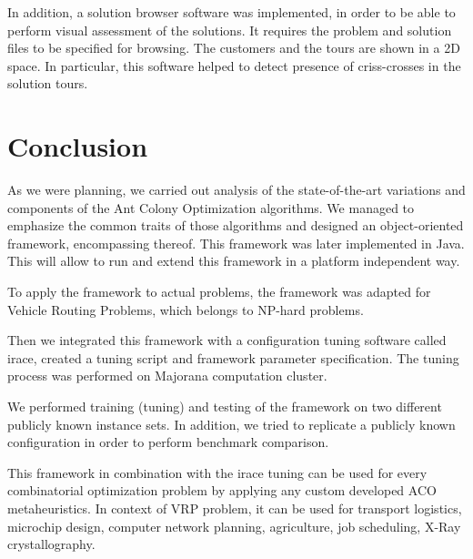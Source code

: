 \documentclass[11pt,a4paper,oneside]{book}
\begin{document}
In addition, a solution browser software was implemented, in order to be able to perform visual assessment of the solutions. It requires the problem and solution files to be specified for browsing. The customers and the tours are shown in a 2D space. In particular, this software helped to detect presence of criss-crosses in the solution tours.




\chapter{Conclusion}

As we were planning, we carried out analysis of the state-of-the-art variations and components of the Ant Colony Optimization algorithms. We managed to emphasize the common traits of those algorithms and designed an object-oriented framework, encompassing thereof. This framework was later implemented in Java. This will allow to run and extend this framework in a platform independent way.

To apply the framework to actual problems, the framework was adapted for Vehicle Routing Problems, which belongs to NP-hard problems.

Then we integrated this framework with a configuration tuning software called irace, created a tuning script and framework parameter specification. The tuning process was performed on Majorana computation cluster.

We performed training (tuning) and testing of the framework on two different publicly known instance sets. In addition, we tried to replicate a publicly known configuration in order to perform benchmark comparison.

This framework in combination with the irace tuning can be used for every combinatorial optimization problem by applying any custom developed ACO metaheuristics. In context of VRP problem, it can be used for transport logistics, microchip design, computer network planning, agriculture, job scheduling, X-Ray crystallography.



\appendix

\backmatter

\printindex %






\end{document}
